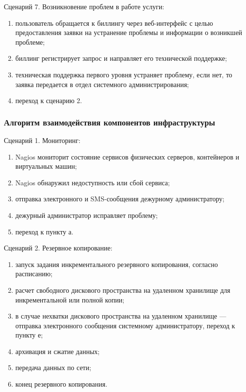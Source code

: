 Сценарий 7. Возникновение проблем в работе услуги:
\begin{enumerate}
  \item пользователь обращается к биллингу через веб-интерфейс с целью предоставления заявки на устранение проблемы и информации о возникшей проблеме;
  \item биллинг регистрирует запрос и направляет его технической поддержке;
  \item техническая поддержка первого уровня устраняет проблему, если нет, то заявка передается в отдел системного администрирования;
  \item переход к сценарию 2.
\end{enumerate}

\subsubsection{Алгоритм взаимодействия компонентов инфраструктуры}

Сценарий 1. Мониторинг:
\begin{enumerate}
  \item Nagios мониторит состояние сервисов физических серверов, контейнеров и виртуальных машин;
  \item Nagios обнаружил недоступность или сбой сервиса;
  \item отправка электронного и SMS-сообщения дежурному администратору;
  \item дежурный администратор исправляет проблему;
  \item переход к пункту а.
\end{enumerate}

Сценарий 2. Резервное копирование:
\begin{enumerate}
  \item запуск задания инкрементального резервного копирования, согласно расписанию;
  \item расчет свободного дискового пространства на удаленном хранилище для инкрементальной или полной копии;
  \item в случае нехватки дискового пространства на удаленном хранилище --- отправка электронного сообщения системному администратору, переход к пункту е;
  \item архивация и сжатие данных;
  \item передача данных по сети;
  \item конец резервного копирования.
\end{enumerate}

